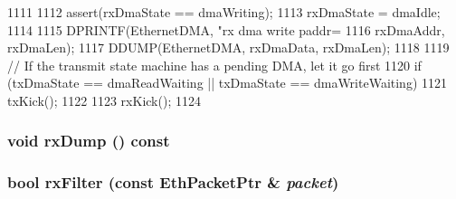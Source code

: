 \begin{DoxyCode}
1111 {
1112     assert(rxDmaState == dmaWriting);
1113     rxDmaState = dmaIdle;
1114 
1115     DPRINTF(EthernetDMA, "rx dma write paddr=%
1116             rxDmaAddr, rxDmaLen);
1117     DDUMP(EthernetDMA, rxDmaData, rxDmaLen);
1118 
1119     // If the transmit state machine has a pending DMA, let it go first
1120     if (txDmaState == dmaReadWaiting || txDmaState == dmaWriteWaiting)
1121         txKick();
1122 
1123     rxKick();
1124 }
\end{DoxyCode}
\hypertarget{classNSGigE_aa1b380dc961134ace0f88ee7743b32b6}{
\subsubsection[{rxDump}]{\setlength{\rightskip}{0pt plus 5cm}void rxDump () const}}
\label{classNSGigE_aa1b380dc961134ace0f88ee7743b32b6}
\hypertarget{classNSGigE_a5bcec2e17f6aca766b063f7a92289bdb}{
\subsubsection[{rxFilter}]{\setlength{\rightskip}{0pt plus 5cm}bool rxFilter (const {\bf EthPacketPtr} \& {\em packet})}}
\label{classNSGigE_a5bcec2e17f6aca766b063f7a92289bdb}



